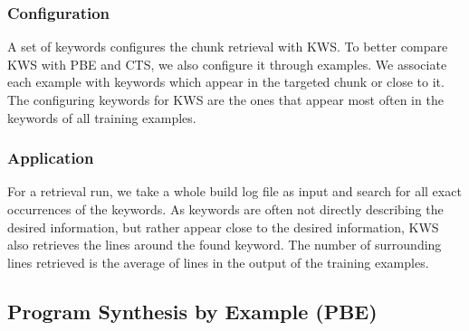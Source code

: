 \subsubsection{Configuration}
A set of keywords configures the chunk retrieval with KWS\@.
To better compare KWS with PBE and CTS, we also configure it through examples.
We associate each example with keywords which appear in the targeted chunk or close to it.
The configuring keywords for KWS are the ones that appear most often in the keywords of all training examples.

\subsubsection{Application}
For a retrieval run, we take a whole build log file as input and search for all exact occurrences of the keywords.
As keywords are often not directly describing the desired information, but rather appear close to the desired information, KWS also retrieves the lines around the found keyword.
The number of surrounding lines retrieved is the average of lines in the output of the training examples.


\subsection{Program Synthesis by Example (PBE)}
\label{sec:expl-pbe}

